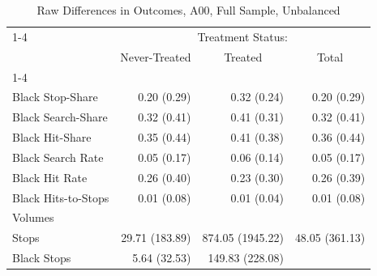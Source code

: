\begin{table}[!h]
\caption{Raw Differences in Outcomes, A00, Full Sample, Unbalanced}
\centering
\begin{tabular}{llll}
\cline{1-4}
\multicolumn{1}{r}{} &
  \multicolumn{3}{c}{Treatment Status:} \\
\multicolumn{1}{r}{} &
  \multicolumn{1}{c}{Never-Treated} &
  \multicolumn{1}{c}{Treated} &
  \multicolumn{1}{c}{Total} \\
\cline{1-4}
\multicolumn{1}{l}{Rates} &
  \multicolumn{1}{r}{} &
  \multicolumn{1}{r}{} &
  \multicolumn{1}{r}{} \\
\multicolumn{1}{l}{\hspace{1em}Black Stop-Share} &
  \multicolumn{1}{r}{0.20 (0.29)} &
  \multicolumn{1}{r}{0.32 (0.24)} &
  \multicolumn{1}{r}{0.20 (0.29)} \\
\multicolumn{1}{l}{\hspace{1em}Black Search-Share} &
  \multicolumn{1}{r}{0.32 (0.41)} &
  \multicolumn{1}{r}{0.41 (0.31)} &
  \multicolumn{1}{r}{0.32 (0.41)} \\
\multicolumn{1}{l}{\hspace{1em}Black Hit-Share} &
  \multicolumn{1}{r}{0.35 (0.44)} &
  \multicolumn{1}{r}{0.41 (0.38)} &
  \multicolumn{1}{r}{0.36 (0.44)} \\
\multicolumn{1}{l}{\hspace{1em}Black Search Rate} &
  \multicolumn{1}{r}{0.05 (0.17)} &
  \multicolumn{1}{r}{0.06 (0.14)} &
  \multicolumn{1}{r}{0.05 (0.17)} \\
\multicolumn{1}{l}{\hspace{1em}Black Hit Rate} &
  \multicolumn{1}{r}{0.26 (0.40)} &
  \multicolumn{1}{r}{0.23 (0.30)} &
  \multicolumn{1}{r}{0.26 (0.39)} \\
\multicolumn{1}{l}{\hspace{1em}Black Hits-to-Stops} &
  \multicolumn{1}{r}{0.01 (0.08)} &
  \multicolumn{1}{r}{0.01 (0.04)} &
  \multicolumn{1}{r}{0.01 (0.08)} \\
\multicolumn{1}{l}{Volumes} &
  \multicolumn{1}{r}{} &
  \multicolumn{1}{r}{} &
  \multicolumn{1}{r}{} \\
\multicolumn{1}{l}{\hspace{1em}Stops} &
  \multicolumn{1}{r}{29.71 (183.89)} &
  \multicolumn{1}{r}{874.05 (1945.22)} &
  \multicolumn{1}{r}{48.05 (361.13)} \\
\multicolumn{1}{l}{\hspace{1em}Black Stops} &
  \multicolumn{1}{r}{5.64 (32.53)} &
  \multicolumn{1}{r}{149.83 (228.08)} &

\end{tabular}
\end{table}
